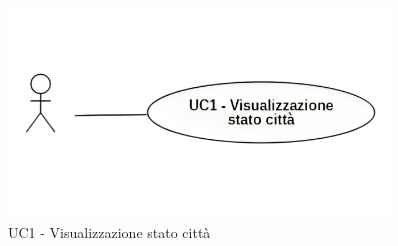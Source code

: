 \documentclass{article}
\begin{document}

\begin{figure}[H]
    \centering
    \includegraphics[width=0.9\textwidth]{Images/uc1.png}
    \caption{UC1 - Visualizzazione stato città}
    \label{fig:UC1}
\end{figure}
\end{document}

